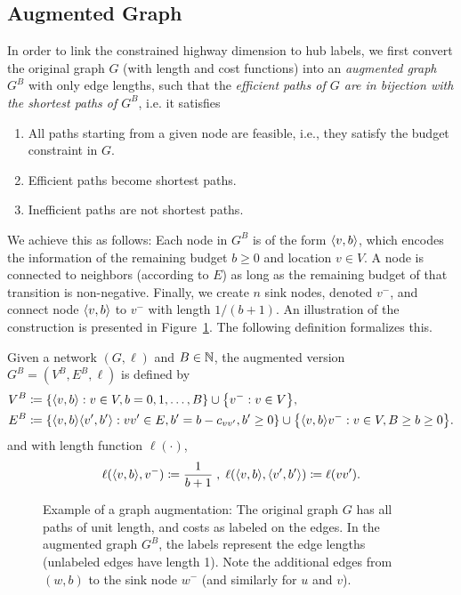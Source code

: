 

\subsection{Augmented Graph}
\label{ssec:aug}

In order to link the constrained highway dimension to hub labels, we first convert the original graph $G$ (with length and cost functions) into an \emph{augmented graph} $G^B$ with only edge lengths, such that the \emph{efficient paths of $G$ are in bijection with the shortest paths of $G^B$}, i.e. it satisfies
\begin{enumerate}[nosep]
	\item All paths starting from a given node are feasible, i.e., they satisfy the budget constraint in $G$.
	\item Efficient paths become shortest paths.
	\item Inefficient paths are not shortest paths.
\end{enumerate}
We achieve this as follows: Each node in $G^B$ is of the form $\langle v,b\rangle$, which encodes the information of the remaining budget $b\geq 0$ and location $v\in V$.
A node is connected to neighbors (according to $E$) as long as the remaining budget of that transition is non-negative.
Finally, we create $n$ sink nodes, denoted $v^-$, and connect node $\langle v,b\rangle$ to $v^-$ with length $1/(b+1)$.
An illustration of the construction is presented in Figure~\ref{fig:augmented}.
The following definition formalizes this. 

\begin{definition}
	Given a network $(G,\ell)$ and $B\in\mathbb{N}$, the augmented version $G^B=(V^B,E^B,\ell)$ is defined by
	\begin{align*}
	V^B &\defeq\crl*{\pp{v,b}: v\in V, b=0,1,\ldots,B}\cup\crl*{v^-:v\in V},\\
	E^B &\defeq\crl*{\pp{v,b}\pp{v',b'} : vv'\in E, b'=b-c_{vv'}, b'\geq 0}\cup \crl*{\pp{v,b}v^-: v\in V, B\geq b\geq 0}.
	\end{align*}
	and with length function $\ell(\cdot)$,
	\begin{align*}
	\ell(\langle v,b\rangle,v^-) \coloneqq \frac{1}{b+1}\;,\;
	\ell(\langle v,b\rangle,\langle v',b'\rangle) \coloneqq \ell(vv').
	\end{align*}
\end{definition}

\begin{figure}
	
	\caption{Example of a graph augmentation: The original graph $G$ has all paths of unit length, and costs as labeled on the edges. In the augmented graph $G^B$, the labels represent the edge lengths (unlabeled edges have length 1). Note the additional edges from $(w,b)$ to the sink node $w^-$ (and similarly for $u$ and $v$). 
	}
	\label{fig:augmented}
\end{figure}


